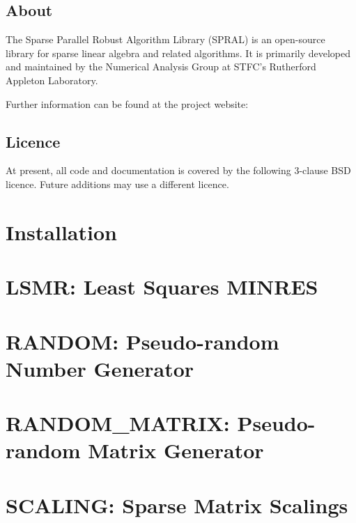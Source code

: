 \documentclass{spralweb}
\begin{document}
\tableofcontents

\let\oldthesection\thesection
\renewcommand{\thesection}{}
\section{About}
The Sparse Parallel Robust Algorithm Library (SPRAL) is an open-source library
for sparse linear algebra and related algorithms. It is primarily developed and
maintained by the Numerical Analysis Group at STFC's Rutherford Appleton Laboratory.

\noindent
Further information can be found at the project website:

\section{Licence}
At present, all code and documentation is covered by the following 3-clause BSD
licence. Future additions may use a different licence.



\renewcommand{\thesection}{\oldthesection}

\chapter{Installation}

\chapter{LSMR: Least Squares MINRES}

\chapter{RANDOM: Pseudo-random Number Generator}

\chapter{RANDOM\_MATRIX: Pseudo-random Matrix Generator}

\chapter{SCALING: Sparse Matrix Scalings}

\end{document}
